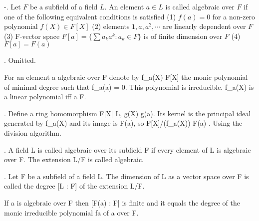 
-\lemma. Let $F$ be a subfield of a field $L$. An element $a \in L$ is called 
algebraic over $F$ if one of the following equivalent conditions is satisfied 
  (1) $f(a) = 0$ for a non-zero polynomial $f(X) \in F[X]$
  (2) elements $1, a, a^2, \cdots$ are linearly dependent over $F$
  (3) F-vector space $F[a] = \{ \sum a_ka^k : a_k \in F \}$ is of finite dimension over $F$
  (4) $F[a] = F(a)$

\proof. Omitted.

  For an element a algebraic over F denote by
                                f_a(X) \in F[X]
the monic polynomial of minimal degree such that f_a(a) = 0. 
  This polynomial is irreducible. f_a(X) is a linear polynomial iff a \in F.

\lemma. Define a ring homomorphism F[X] \rarr L, g(X) \rarr g(a). Its kernel is the
  principal ideal generated by f_a(X) and its image is F(a), so
                              F[X]/(f_a(X)) \cong F(a)
\proof. Using the division algorithm.
                            
. A field L is called algebraic over its subfield F if every element of L is
algebraic over F. The extension L/F is called algebraic. 

. Let F be a subfield of a field L. The dimension of L as a vector space
over F is called the degree [L : F] of the extension L/F.

  If a is algebraic over F then [F(a) : F] is finite and it equals the degree of the
monic irreducible polynomial fa of a over F.

